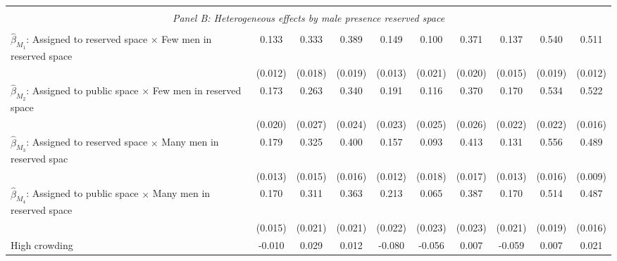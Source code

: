 \begin{tabular}{l*{9}{c}}
\hline \\[-1ex] \multicolumn{10}{c}{\textit{Panel B: Heterogeneous effects by male presence reserved space}} \\\\[-1ex]
$\hat\beta_{M_1}$: Assigned to reserved space $\times$ Few men in reserved space&       0.133\sym{***}&       0.333\sym{***}&       0.389\sym{***}&       0.149\sym{***}&       0.100\sym{***}&       0.371\sym{***}&       0.137\sym{***}&       0.540\sym{***}&       0.511\sym{***}\\
                    &     (0.012)         &     (0.018)         &     (0.019)         &     (0.013)         &     (0.021)         &     (0.020)         &     (0.015)         &     (0.019)         &     (0.012)         \\
[1em]
$\hat\beta_{M_2}$: Assigned to public space $\times$ Few men in reserved space&       0.173\sym{***}&       0.263\sym{***}&       0.340\sym{***}&       0.191\sym{***}&       0.116\sym{***}&       0.370\sym{***}&       0.170\sym{***}&       0.534\sym{***}&       0.522\sym{***}\\
                    &     (0.020)         &     (0.027)         &     (0.024)         &     (0.023)         &     (0.025)         &     (0.026)         &     (0.022)         &     (0.022)         &     (0.016)         \\
[1em]
$\hat\beta_{M_3}$: Assigned to reserved space $\times$ Many men in reserved spac&       0.179\sym{***}&       0.325\sym{***}&       0.400\sym{***}&       0.157\sym{***}&       0.093\sym{***}&       0.413\sym{***}&       0.131\sym{***}&       0.556\sym{***}&       0.489\sym{***}\\
                    &     (0.013)         &     (0.015)         &     (0.016)         &     (0.012)         &     (0.018)         &     (0.017)         &     (0.013)         &     (0.016)         &     (0.009)         \\
[1em]
$\hat\beta_{M_4}$: Assigned to public space $\times$ Many men in reserved space&       0.170\sym{***}&       0.311\sym{***}&       0.363\sym{***}&       0.213\sym{***}&       0.065\sym{***}&       0.387\sym{***}&       0.170\sym{***}&       0.514\sym{***}&       0.487\sym{***}\\
                    &     (0.015)         &     (0.021)         &     (0.021)         &     (0.022)         &     (0.023)         &     (0.023)         &     (0.021)         &     (0.019)         &     (0.016)         \\
[1em]
High crowding       &      -0.010         &       0.029         &       0.012         &      -0.080\sym{*}  &      -0.056         &       0.007         &      -0.059         &       0.007         &       0.021         \\

\end{tabular}
